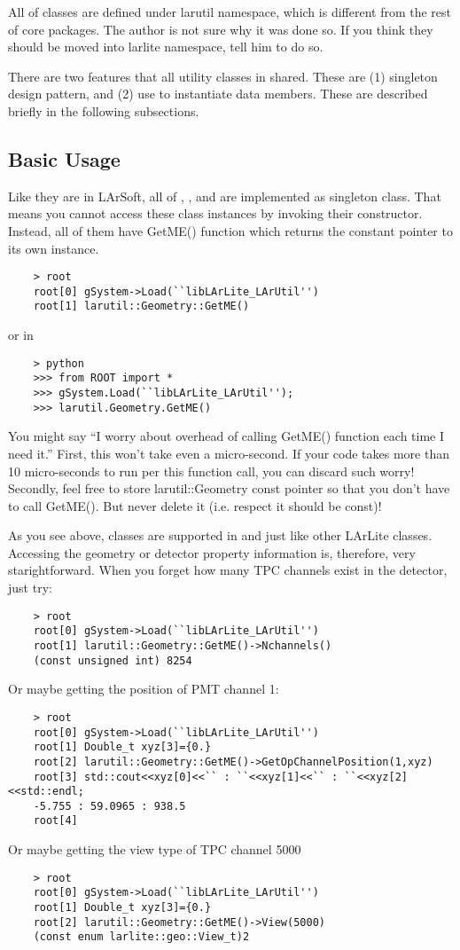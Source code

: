 All of \LArUtil classes are defined under {\ttfamily larutil} namespace, which is different from the rest of core packages. The author is not sure why it was done so. If you think they should be moved into {\ttfamily larlite} namespace, tell him to do so.

There are two features that all utility classes in \LArUtil shared. These are (1) singleton design pattern, and (2) use  to instantiate data members. These are described briefly in the following subsections.

\subsection{Basic Usage}
Like they are in LArSoft, all of \Geometry, \LArProperties, and \DetectorProperties are implemented as singleton class. That means you cannot access these class instances by invoking their constructor. Instead, all of them have {\ttfamily GetME()} function which returns the constant pointer to its own instance.
\begin{lstlisting}
    > root
    root[0] gSystem->Load(``libLArLite_LArUtil'')
    root[1] larutil::Geometry::GetME()
\end{lstlisting}
or in \PyROOT
\begin{lstlisting}
    > python
    >>> from ROOT import *
    >>> gSystem.Load(``libLArLite_LArUtil'');
    >>> larutil.Geometry.GetME()
\end{lstlisting}
You might say ``I worry about overhead of calling {\ttfamily GetME()} function each time I need it.'' First, this won't take even a micro-second. If your code takes more than 10 micro-seconds to run per this function call, you can discard such worry! Secondly, feel free to store {\ttfamily larutil::Geometry} const pointer so that you don't have to call {\ttfamily GetME()}. But never delete it (i.e. respect it should be const)! 

As you see above, \LArUtil classes are supported in \CINT and \PyROOT just like other LArLite classes. Accessing the geometry or detector property information is, therefore, very starightforward. When you forget how many TPC channels exist in the detector, just try:
\begin{lstlisting}
    > root
    root[0] gSystem->Load(``libLArLite_LArUtil'')
    root[1] larutil::Geometry::GetME()->Nchannels()
    (const unsigned int) 8254
\end{lstlisting}
Or maybe getting the position of PMT channel 1:
\begin{lstlisting}
    > root
    root[0] gSystem->Load(``libLArLite_LArUtil'')
    root[1] Double_t xyz[3]={0.}
    root[2] larutil::Geometry::GetME()->GetOpChannelPosition(1,xyz)
    root[3] std::cout<<xyz[0]<<`` : ``<<xyz[1]<<`` : ``<<xyz[2]<<std::endl;
    -5.755 : 59.0965 : 938.5
    root[4] 
\end{lstlisting}
Or maybe getting the view type of TPC channel 5000
\begin{lstlisting}
    > root
    root[0] gSystem->Load(``libLArLite_LArUtil'')
    root[1] Double_t xyz[3]={0.}
    root[2] larutil::Geometry::GetME()->View(5000)
    (const enum larlite::geo::View_t)2
\end{lstlisting}

